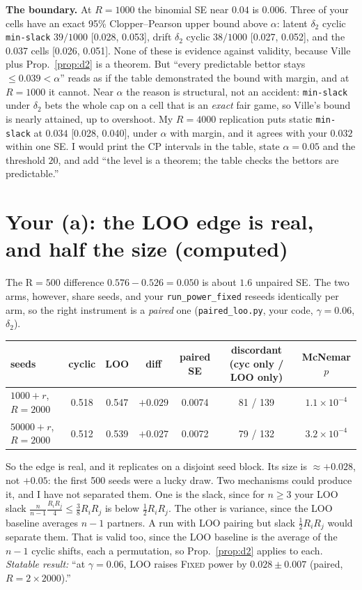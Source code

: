 \documentclass[11pt]{article}
\begin{document}
\textbf{The boundary.} At $R=1000$ the binomial SE near $0.04$ is $0.006$. Three of your cells have an exact 95\% Clopper--Pearson upper bound above $\alpha$: latent $\delta_2$ cyclic \texttt{min-slack} $39/1000$ [0.028, 0.053], drift $\delta_2$ cyclic $38/1000$ [0.027, 0.052], and the 0.037 cells [0.026, 0.051].
None of these is evidence against validity, because Ville plus Prop.~\ref{prop:d2} is a theorem. But ``every predictable bettor stays $\le0.039<\alpha$'' reads as if the table demonstrated the bound with margin, and at $R=1000$ it cannot.
Near $\alpha$ the reason is structural, not an accident: \texttt{min-slack} under $\delta_2$ bets the whole cap on a cell that is an \emph{exact} fair game, so Ville's bound is nearly attained, up to overshoot.
My $R=4000$ replication puts static \texttt{min-slack} at $0.034$ [0.028, 0.040], under $\alpha$ with margin, and it agrees with your $0.032$ within one SE.
I would print the CP intervals in the table, state $\alpha=0.05$ and the threshold $20$, and add ``the level is a theorem; the table checks the bettors are predictable.''

\section{Your (a): the LOO edge is real, and half the size (computed)}
The R$=500$ difference $0.576-0.526=0.050$ is about $1.6$ unpaired SE. The two arms, however, share seeds, and your \texttt{run\_power\_fixed} reseeds identically per arm, so the right instrument is a \emph{paired} one (\texttt{paired\_loo.py}, your code, $\gamma=0.06$, $\delta_2$).
\begin{center}\small
\begin{tabular}{lcccccc}
\toprule
seeds & cyclic & LOO & diff & paired SE & discordant (cyc only / LOO only) & McNemar $p$\\
\midrule
$1000+r$, $R=2000$ & 0.518 & 0.547 & $+0.029$ & 0.0074 & 81 / 139 & $1.1\times10^{-4}$\\
$50000+r$, $R=2000$ & 0.512 & 0.539 & $+0.027$ & 0.0072 & 79 / 132 & $3.2\times10^{-4}$\\
\bottomrule
\end{tabular}
\end{center}
So the edge is real, and it replicates on a disjoint seed block. Its size is $\approx+0.028$, not $+0.05$: the first 500 seeds were a lucky draw.
Two mechanisms could produce it, and I have not separated them. One is the slack, since for $n\ge3$ your LOO slack $\frac{n}{n-1}\frac{R_iR_j}4\le\frac38R_iR_j$ is below $\frac12R_iR_j$. The other is variance, since the LOO baseline averages $n-1$ partners.
A run with LOO pairing but slack $\tfrac12R_iR_j$ would separate them. That is valid too, since the LOO baseline is the average of the $n-1$ cyclic shifts, each a permutation, so Prop.~\ref{prop:d2} applies to each.
\emph{Statable result:} ``at $\gamma=0.06$, LOO raises \textsc{Fixed} power by $0.028\pm0.007$ (paired, $R=2\times2000$).''
\end{document}
